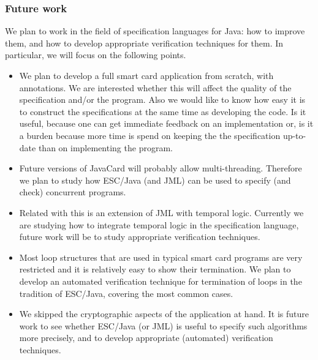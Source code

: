 \documentclass[a4paper]{llncs}
\begin{document}
\subsubsection{Future work} We plan to work in the field of
specification languages for Java: how to improve them, and how to
develop appropriate verification techniques for them. In particular,
we will focus on the following points.
\begin{itemize}
\item We plan to develop a full smart card application from scratch, with
annotations. We are interested whether this will affect the quality of 
the specification and/or the program. Also we would like to know how
easy it is to construct the specifications at the same time as
developing the code. Is it useful, because one can get immediate
feedback on an implementation or, is it a burden because more time
is spend on keeping the the specification up-to-date than on
implementing the program.
\item Future versions of JavaCard will probably allow
multi-threading. Therefore we plan to study how ESC/Java (and JML)
can be used to specify (and check) concurrent programs.
\item Related with this is an extension of JML with
temporal logic. Currently we are studying how to integrate temporal
logic in the specification language, future work will be to study
appropriate verification techniques.
\item Most loop structures that are used in typical smart card
programs are very restricted and it is relatively easy to show their
termination. We plan to develop an automated verification technique for
termination of loops in the tradition of ESC/Java, covering the most
common cases.
\item We skipped the cryptographic aspects of the application at
hand. It is future work to see whether ESC/Java (or JML) is useful to
specify such algorithms more precisely, and to develop appropriate
(automated) verification techniques.
\end{itemize}



\end{document}
